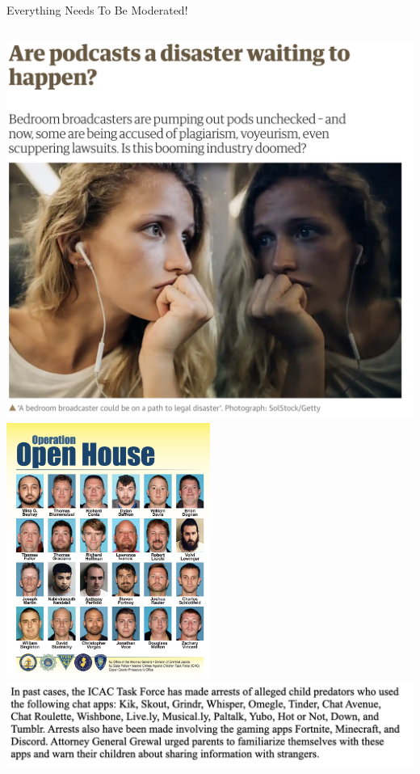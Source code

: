 \documentclass[nobackground,dvipsnames,table,aspectratio=169]{beamer}
\begin{document}
\begin{frame}{Everything Needs To Be Moderated!}
    \begin{columns}
            \includegraphics[width=\textwidth]{podcast-disaster-article}
            \centering
            \includegraphics[width=0.5\textwidth]{operation-open-house}
            \includegraphics[width=\textwidth]{operation-open-house-apps}
    \end{columns}
\end{frame}
\end{document}
